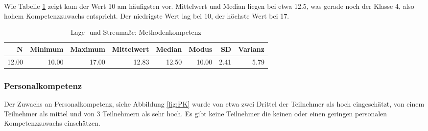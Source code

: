 \documentclass[12pt,smallheadings, bibliography=totoc]{scrartcl}
\begin{document}
Wie Tabelle \ref{tab:lMK} zeigt kam der Wert 10 am häufigsten vor.
Mittelwert und Median liegen bei etwa 12.5, was gerade noch der Klasse
4, also hohem Kompetenzzuwachs entspricht. Der niedrigste Wert lag bei
10, der höchste Wert bei 17.

\begin{table}[H]
\centering
\caption{Lage- und Streumaße: Methodenkompetenz}
\label{tab:lMK}
\begin{tabular}{rrrrrrrr}
  \hline
  N & Minimum & Maximum & Mittelwert & Median & Modus & SD & Varianz \\
  \hline
  12.00 & 10.00 & 17.00 & 12.83 & 12.50 & 10.00 & 2.41 & 5.79 \\
   \hline
\end{tabular}
\end{table}

\subsubsection{Personalkompetenz}\label{personalkompetenz}

Der Zuwachs an Personalkompetenz, siehe Abbildung \ref{fig:PK} wurde von
etwa zwei Drittel der Teilnehmer als hoch eingeschätzt, von einem
Teilnehmer als mittel und von 3 Teilnehmern als sehr hoch. Es gibt keine
Teilnehmer die keinen oder einen geringen personalen Kompetenzzuwachs
einschätzen.
\end{document}
